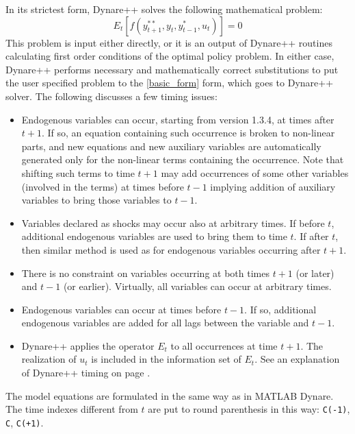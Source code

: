\documentclass[10pt]{article}
\begin{document}
In its strictest form, Dynare++ solves the following mathematical problem:
\begin{equation}\label{basic_form}
E_t[f(y^{**}_{t+1},y_t,y^*_{t-1},u_t)]=0
\end{equation}
This problem is input either directly, or it is an output of Dynare++
routines calculating first order conditions of the optimal policy
problem. In either case, Dynare++ performs necessary and
mathematically correct substitutions to put the user specified problem
to the \eqref{basic_form} form, which goes to Dynare++ solver. The
following discusses a few timing issues:
\begin{itemize}
\item Endogenous variables can occur, starting from version 1.3.4, at
times after $t+1$. If so, an equation containing such occurrence is
broken to non-linear parts, and new equations and new auxiliary
variables are automatically generated only for the non-linear terms
containing the occurrence. Note that shifting such terms to time $t+1$
may add occurrences of some other variables (involved in the terms) at
times before $t-1$ implying addition of auxiliary variables to bring
those variables to $t-1$.
\item Variables declared as shocks may occur also at arbitrary
times. If before $t$, additional endogenous variables are used to
bring them to time $t$. If after $t$, then similar method is used as
for endogenous variables occurring after $t+1$.
\item There is no constraint on variables occurring at both times
$t+1$ (or later) and $t-1$ (or earlier). Virtually, all variables can
occur at arbitrary times.
\item Endogenous variables can occur at times before $t-1$. If so,
additional endogenous variables are added for all lags between the
variable and $t-1$.
\item Dynare++ applies the operator $E_t$ to all occurrences at time
$t+1$. The realization of $u_t$ is included in the information set of
$E_t$. See an explanation of Dynare++ timing on page \pageref{timing}.
\end{itemize}

The model equations are formulated in the same way as in MATLAB
Dynare. The time indexes different from $t$ are put to round
parenthesis in this way: {\tt C(-1)}, {\tt C}, {\tt C(+1)}.
\end{document}

